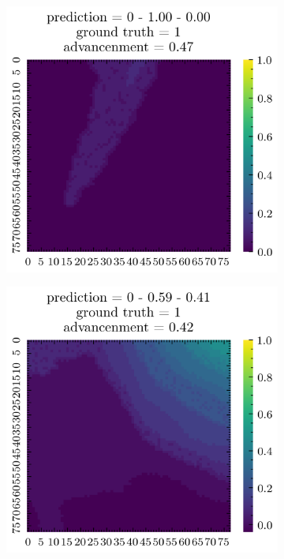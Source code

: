 \begin{figure}[H]
    \centering
    \begin{subfigure}[b]{0.19\textwidth}
        \includegraphics[width=\linewidth]{../img/5/quarry/false_positive/patch-2d-0.png}
    \end{subfigure}
    \begin{subfigure}[b]{0.19\textwidth}
        \includegraphics[width=\linewidth]{../img/5/quarry/false_positive/patch-2d-1.png}

\end{subfigure}
\end{figure}
